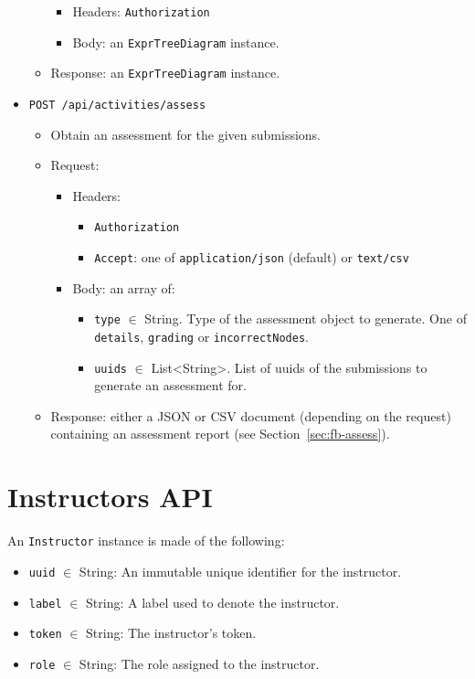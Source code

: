 \begin{chapterBody}
\begin{itemize}
\begin{itemize}
        \begin{itemize}
            \item Headers: \texttt{Authorization}
            \item Body: an \texttt{ExprTreeDiagram} instance.
        \end{itemize}
        \item Response: an \texttt{ExprTreeDiagram} instance.
    \end{itemize}
    \item \texttt{POST /api/activities/assess}
    \begin{itemize}
        \item Obtain an assessment for the given submissions.
        \item Request:
        \begin{itemize}
            \item Headers:
            \begin{itemize}
                \item \texttt{Authorization}
                \item \texttt{Accept}: one of \texttt{application/json}
(default) or \texttt{text/csv}
            \end{itemize}
            \item Body: an array of:
            \begin{itemize}
                \item \texttt{type} $ \in $ String. Type of the assessment
object to generate. One of \texttt{details}, \texttt{grading} or
\texttt{incorrectNodes}.
                \item \texttt{uuids} $ \in $ List<String>. List of uuids
of the submissions to generate an assessment for.
            \end{itemize}
        \end{itemize}
        \item Response: either a JSON or CSV document (depending on the
request) containing an assessment report (see Section~\ref{sec:fb-assess}).
    \end{itemize}
\end{itemize}

\section{Instructors API}

An \texttt{Instructor} instance is made of the following:
\begin{itemize}
    \item \texttt{uuid} $ \in $ String: An immutable unique identifier for the 
instructor.
    \item \texttt{label} $ \in $ String: A label used to denote the instructor.
    \item \texttt{token} $ \in $ String: The instructor's token.
    \item \texttt{role} $ \in $ String: The role assigned to the instructor.
\end{itemize}


\end{chapterBody}

